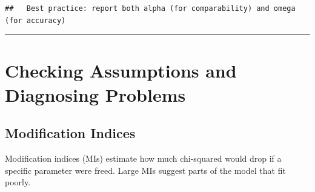 \documentclass[
]{article}
\begin{document}
\begin{verbatim}
##   Best practice: report both alpha (for comparability) and omega (for accuracy)
\end{verbatim}

\begin{center}\rule{0.5\linewidth}{0.5pt}\end{center}

\section{Checking Assumptions and Diagnosing
Problems}\label{checking-assumptions-and-diagnosing-problems}

\subsection{Modification Indices}\label{modification-indices}

Modification indices (MIs) estimate how much chi-squared would drop if a
specific parameter were freed. Large MIs suggest parts of the model that
fit poorly.
\end{document}
